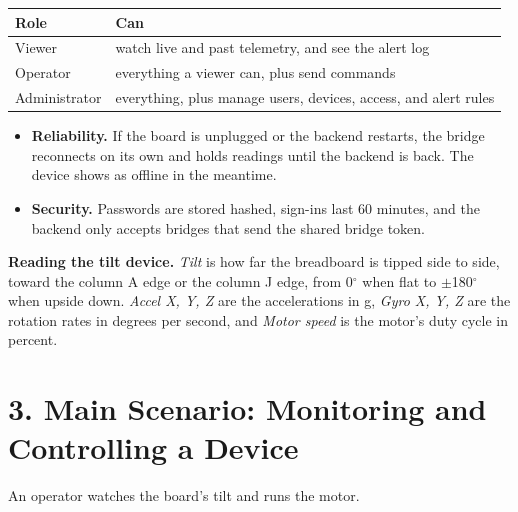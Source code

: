 \documentclass[11pt]{article}
\begin{document}
\begin{center}
\begin{tabular}{@{} l l @{}}
\toprule
\textbf{Role} & \textbf{Can} \\
\midrule
Viewer & watch live and past telemetry, and see the alert log \\
Operator & everything a viewer can, plus send commands \\
Administrator & everything, plus manage users, devices, access, and alert rules \\
\bottomrule
\end{tabular}
\end{center}

\begin{itemize}[leftmargin=1.5em, itemsep=2pt]
\item \textbf{Reliability.} If the board is unplugged or the backend restarts, the bridge reconnects on its own and holds readings until the backend is back. The device shows as offline in the meantime.
\item \textbf{Security.} Passwords are stored hashed, sign-ins last 60 minutes, and the backend only accepts bridges that send the shared bridge token.
\end{itemize}

\textbf{Reading the tilt device.} \emph{Tilt} is how far the breadboard is tipped side to side, toward the column A edge or the column J edge, from 0$^\circ$ when flat to $\pm$180$^\circ$ when upside down. \emph{Accel X, Y, Z} are the accelerations in g, \emph{Gyro X, Y, Z} are the rotation rates in degrees per second, and \emph{Motor speed} is the motor's duty cycle in percent.

\section{3. Main Scenario: Monitoring and Controlling a Device}

An operator watches the board's tilt and runs the motor.
\end{document}
